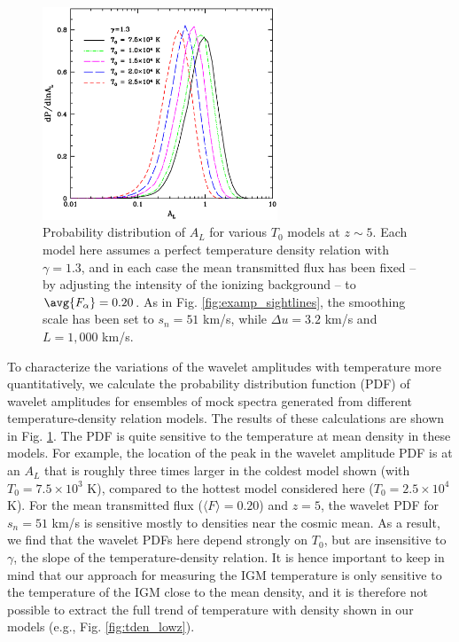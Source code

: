 \begin{figure}
\bc
\includegraphics[width=7cm]{f11.eps}
\caption{Probability distribution of $A_L$ for various $T_0$ models at $z \sim 5$. Each model here assumes a perfect temperature
density relation with $\gamma=1.3$, and in each case the mean transmitted flux
has been fixed -- by adjusting the intensity of the ionizing background -- to $\avg{F_\alpha}=0.20$. As in Fig. \ref{fig:examp_sightlines}, 
the smoothing scale has been set to $s_n=51$ km/s, while
$\Delta u = 3.2$ km/s and $L=1,000$ km/s.}
\label{fig:pdf_amp}
\ec
\end{figure}

To characterize the variations of the wavelet amplitudes with temperature more quantitatively, we calculate the probability distribution function (PDF) of wavelet amplitudes for ensembles
of mock spectra generated from different temperature-density relation models. The results of these calculations are shown
in Fig. \ref{fig:pdf_amp}.
The PDF is quite sensitive to the temperature
at mean density in these models. For example, the location of the peak in the wavelet amplitude PDF is at an $A_L$ that is roughly
three times larger in the coldest model shown (with $T_0 = 7.5 \times 10^3$ K), compared to the hottest model considered here
($T_0 = 2.5 \times 10^4$ K). 
For the mean transmitted flux ($\langle F \rangle=0.20$) and $z=5$, the wavelet PDF for $s_n=51$ km/s is
sensitive mostly to densities near the cosmic mean. As a result, we find that the wavelet PDFs here depend strongly on
$T_0$, but are insensitive to $\gamma$, the slope of the temperature-density relation. It is hence important to keep in mind that our approach
for measuring the IGM temperature is only sensitive to the temperature of the IGM close to the mean density, and it is therefore not possible
to extract
the full trend of temperature with density shown in our models (e.g., Fig. \ref{fig:tden_lowz}).

